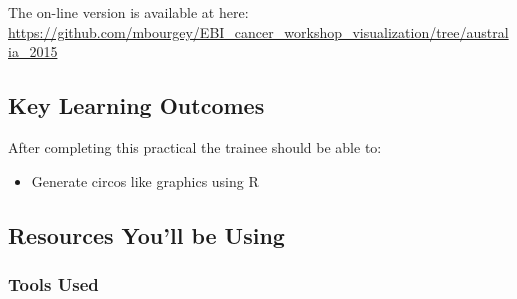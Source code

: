 
\setModuleContributions{%
}



\chapter{\moduleTitle}


\newpage


The on-line version is available at here:
\url{https://github.com/mbourgey/EBI_cancer_workshop_visualization/tree/australia_2015}

\section{Key Learning Outcomes}

After completing this practical the trainee should be able to:

\begin{itemize}
  \item Generate circos like graphics using R
\end{itemize}


\section{Resources You'll be Using}

\subsection{Tools Used}

